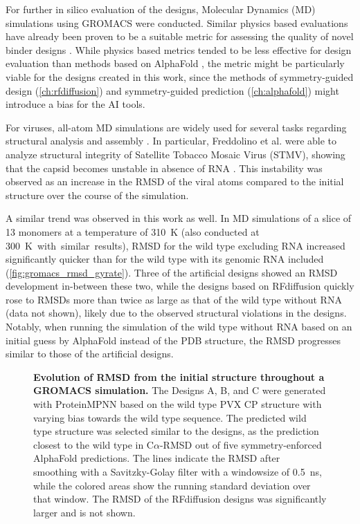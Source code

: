 For further in silico evaluation of the designs, Molecular Dynamics (MD) simulations using GROMACS \cite{gromacs_general} were conducted. Similar physics based evaluations have already been proven to be a suitable metric for assessing the quality of novel binder designs \cite{physics_binder_design}. While physics based metrics tended to be less effective for design evaluation than methods based on AlphaFold \cite{binder_design}, the metric might be particularly viable for the designs created in this work, since the methods of symmetry-guided design (\autoref{ch:rfdiffusion}) and symmetry-guided prediction (\autoref{ch:alphafold}) might introduce a bias for the AI tools. 

For viruses, all-atom MD simulations are widely used for several tasks regarding structural analysis and assembly \cite{md_viral_analysis_review}. In particular, Freddolino et al. were able to analyze structural integrity of Satellite Tobacco Mosaic Virus  (STMV), showing that the capsid becomes unstable in absence of RNA \cite{md_tmv_stability}. This instability was observed as an increase in the RMSD of the viral atoms compared to the initial structure over the course of the simulation. 

A similar trend was observed in this work as well. In MD simulations of a slice of 13 monomers at a temperature of \SI{310}{\kelvin} (also conducted at \SI{300}{\kelvin with similar results}), RMSD for the wild type excluding RNA increased significantly quicker than for the wild type with its genomic RNA included (\autoref{fig:gromacs_rmsd_gyrate}). Three of the artificial designs showed an RMSD development in-between these two, while the designs based on RFdiffusion quickly rose to RMSDs more than twice as large as that of the wild type without RNA (data not shown), likely due to the observed structural violations in the designs. Notably, when running the simulation of the wild type without RNA based on an initial guess by AlphaFold instead of the PDB structure, the RMSD progresses similar to those of the artificial designs.

\begin{figure}
    
    \caption{\textbf{Evolution of RMSD from the initial structure throughout a GROMACS simulation. } The Designs A, B, and C were generated with ProteinMPNN based on the wild type PVX CP structure with varying bias towards the wild type sequence. The predicted wild type structure was selected similar to the designs, as the prediction closest to the wild type in C$\alpha$-RMSD out of five symmetry-enforced AlphaFold predictions. The lines indicate the RMSD after smoothing with a Savitzky-Golay filter with a windowsize of \SI{0.5}{\nano\second}, while the colored areas show the running standard deviation over that window. The RMSD of the RFdiffusion designs was significantly larger and is not shown. }
    \label{fig:gromacs_rmsd_gyrate}
\end{figure}

